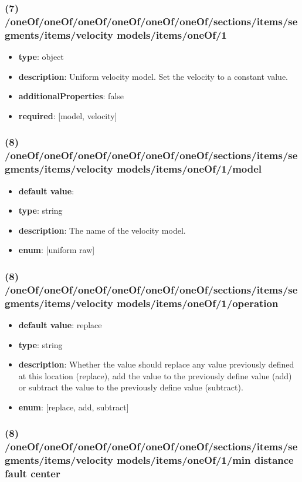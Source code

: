 \subsubsection{(7) /oneOf/oneOf/oneOf/oneOf/oneOf/oneOf/sections/items/segments/items/velocity models/items/oneOf/1}
\begin{itemize}[leftmargin=7em]\item {\bf type}: object
\item {\bf description}: Uniform velocity model. Set the velocity to a constant value.
\item {\bf additionalProperties}: false
\item {\bf required}: [model, velocity]\end{itemize}
\subsubsection{(8) /oneOf/oneOf/oneOf/oneOf/oneOf/oneOf/sections/items/segments/items/velocity models/items/oneOf/1/model}
\begin{itemize}[leftmargin=8em]\item {\bf default value}: 
\item {\bf type}: string
\item {\bf description}: The name of the velocity model.
\item {\bf enum}: [uniform raw]\end{itemize}\subsubsection{(8) /oneOf/oneOf/oneOf/oneOf/oneOf/oneOf/sections/items/segments/items/velocity models/items/oneOf/1/operation}
\begin{itemize}[leftmargin=8em]\item {\bf default value}: replace
\item {\bf type}: string
\item {\bf description}: Whether the value should replace any value previously defined at this location (replace), add the value to the previously define value (add) or subtract the value to the previously define value (subtract).
\item {\bf enum}: [replace, add, subtract]\end{itemize}\subsubsection{(8) /oneOf/oneOf/oneOf/oneOf/oneOf/oneOf/sections/items/segments/items/velocity models/items/oneOf/1/min distance fault center}
